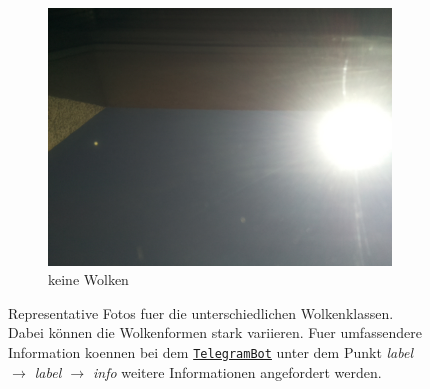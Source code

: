 \begin{figure}[h]
\begin{subfigure}[b]{0.31\textwidth}
		\end{subfigure}
		\begin{subfigure}[b]{0.31\textwidth}
		\begin{center}
				\includegraphics[width=\textwidth]{./pictures/cloudtypes/no_clouds.pdf}
		\end{center}
		\caption{keine Wolken}
		\label{fig:no_clouds}
		\end{subfigure}
		\caption{Representative Fotos fuer die unterschiedlichen Wolkenklassen.
		Dabei können die Wolkenformen stark variieren. Fuer umfassendere
		Information koennen bei dem
		\href{https://telegram.me/weatherpi_bot}{\texttt{TelegramBot}} unter dem
		Punkt \textit{label $\rightarrow$ label $\rightarrow$ info} weitere 
		Informationen angefordert werden.}
		\label{fig:classes}
\end{figure}
